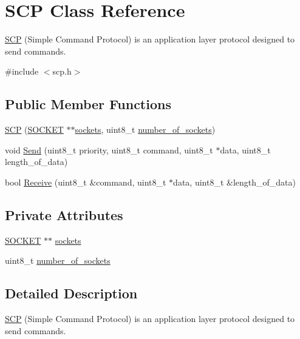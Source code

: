 \hypertarget{class_s_c_p}{}\section{S\+CP Class Reference}
\label{class_s_c_p}


\hyperlink{class_s_c_p}{S\+CP} (Simple Command Protocol) is an application layer protocol designed to send commands.  




{\ttfamily \#include $<$scp.\+h$>$}

\subsection*{Public Member Functions}
\begin{DoxyCompactItemize}
\item 
\hyperlink{class_s_c_p_a9ab03c4d3f03f25c1953b13120ec7b71}{S\+CP} (\hyperlink{class_s_o_c_k_e_t}{S\+O\+C\+K\+ET} $\ast$$\ast$\hyperlink{class_s_c_p_a0b1f95d779a178ee512c260162b5c9d7}{sockets}, uint8\+\_\+t \hyperlink{class_s_c_p_a60870833801da77a079ebed8383c91bf}{number\+\_\+of\+\_\+sockets})
\item 
void \hyperlink{class_s_c_p_a02460c47705c42c2ade1608007d7966a}{Send} (uint8\+\_\+t priority, uint8\+\_\+t command, uint8\+\_\+t $\ast$data, uint8\+\_\+t length\+\_\+of\+\_\+data)
\item 
bool \hyperlink{class_s_c_p_ab01a551b8edf803faaea5b0310345498}{Receive} (uint8\+\_\+t \&command, uint8\+\_\+t $\ast$data, uint8\+\_\+t \&length\+\_\+of\+\_\+data)
\end{DoxyCompactItemize}
\subsection*{Private Attributes}
\begin{DoxyCompactItemize}
\item 
\hyperlink{class_s_o_c_k_e_t}{S\+O\+C\+K\+ET} $\ast$$\ast$ \hyperlink{class_s_c_p_a0b1f95d779a178ee512c260162b5c9d7}{sockets}
\item 
uint8\+\_\+t \hyperlink{class_s_c_p_a60870833801da77a079ebed8383c91bf}{number\+\_\+of\+\_\+sockets}
\end{DoxyCompactItemize}


\subsection{Detailed Description}
\hyperlink{class_s_c_p}{S\+CP} (Simple Command Protocol) is an application layer protocol designed to send commands. 

